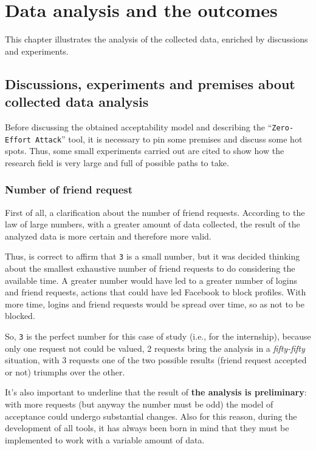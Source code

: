 
\chapter{Data analysis and the outcomes}
\label{cap:data-analysis}
This chapter illustrates the analysis of the collected data, enriched by discussions and experiments.
\section{Discussions, experiments and premises about collected data analysis}
Before discussing the obtained acceptability model and describing the ``\texttt{Zero-Effort Attack}'' tool, it is necessary to pin some premises and discuss some hot spots. Thus, some small experiments carried out are cited to show how the research field is very large and full of possible paths to take.

\subsection{Number of friend request}
\label{cap:number-friend-req}
First of all, a clarification about the number of friend requests. According to the law of large numbers, with a greater amount of data collected, the result of the analyzed data is more certain and therefore more valid.
\par \noindent Thus, is correct to affirm that \texttt{3} is a small number, but it was decided thinking about the smallest exhaustive number of friend requests to do considering the available time. A greater number would have led to a greater number of logins and friend requests, actions that could have led Facebook to block profiles. With more time, logins and friend requests would be spread over time, so as not to be blocked.
\par \noindent So, \texttt{3} is the perfect number for this case of study (i.e., for the internship), because only one request not could be valued, 2 requests bring the analysis in a \textit{fifty-fifty} situation, with 3 requests one of the two possible results (friend request accepted or not) triumphs over the other.
\par \noindent It's also important to underline that the result of \textbf{the analysis is preliminary}: with more requests (but anyway the number must be odd) the model of acceptance could undergo substantial changes. Also for this reason, during the development of all tools, it has always been born in mind that they must be implemented to work with a variable amount of data.
